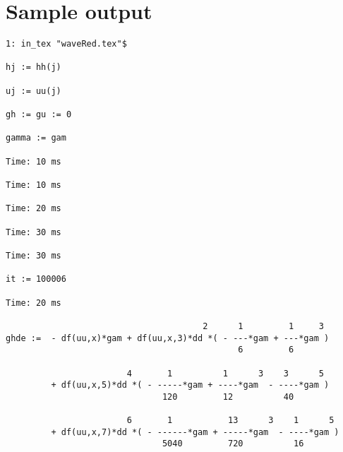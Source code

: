 \documentclass[10pt,a5paper]{article}
\begin{document}
\section{Sample output}
\begin{verbatim}
1: in_tex "waveRed.tex"$

hj := hh(j)

uj := uu(j)

gh := gu := 0

gamma := gam

Time: 10 ms

Time: 10 ms

Time: 20 ms

Time: 30 ms

Time: 30 ms

it := 100006

Time: 20 ms

                                       2      1         1     3
ghde :=  - df(uu,x)*gam + df(uu,x,3)*dd *( - ---*gam + ---*gam )
                                              6         6

                        4       1          1      3    3      5
         + df(uu,x,5)*dd *( - -----*gam + ----*gam  - ----*gam )
                               120         12          40

                        6       1           13      3    1      5
         + df(uu,x,7)*dd *( - ------*gam + -----*gam  - ----*gam )
                               5040         720          16

\end{verbatim}
\end{document}
